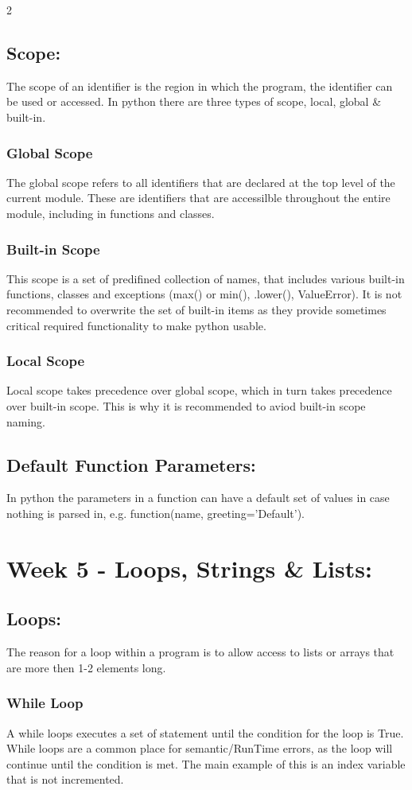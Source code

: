 \documentclass[a4paper]{report}
\begin{document}
\begin{flushleft}
\begin{multicols}{2}
	\subsection*{Scope:}
	The scope of an identifier is the region in which the program, the identifier can be used or accessed. In python there are three types of scope, local, global \& built-in.
	\subsubsection*{Global Scope}
	The global scope refers to all identifiers that are declared at the top level of the current module. These are identifiers that are accessilble throughout the entire module, including in functions and classes.
	\subsubsection*{Built-in Scope}
	This scope is a set of predifined collection of names, that includes various built-in functions, classes and exceptions (max() or min(), .lower(), ValueError). It is not recommended to overwrite the set of built-in items as they provide sometimes critical required functionality to make python usable.
	\subsubsection*{Local Scope}
	Local scope takes precedence over global scope, which in turn takes precedence over built-in scope. This is why it is recommended to aviod built-in scope naming. 

	\subsection*{Default Function Parameters:}
	In python the parameters in a function can have a default set of values in case nothing is parsed in, e.g. function(name, greeting='Default').

	\section*{Week 5 - Loops, Strings \& Lists:}
	\subsection*{Loops:}
	The reason for a loop within a program is to allow access to lists or arrays that are more then 1-2 elements long.
	\subsubsection*{While Loop}
	A while loops executes a set of statement until the condition for the loop is True. While loops are a common place for semantic/RunTime errors, as the loop will continue until the condition is met. The main example of this is an index variable that is not incremented.

\end{multicols}
\end{flushleft}
\end{document}
